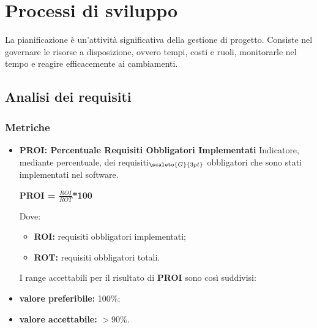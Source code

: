 \section{Processi di sviluppo}\label{QualitaDiProcessoProcessiDiSviluppo}
La pianificazione è un’attività significativa della gestione di progetto.
Consiste nel governare le risorse a disposizione, ovvero tempi, costi e ruoli, monitorarle nel tempo e reagire efficacemente ai cambiamenti.

\subsection{Analisi dei requisiti}\label{QualitaDiProcessoProcessiDiSviluppoAnalisiDeiRequisiti}
\subsubsection{Metriche}\label{MetricheProcessiDiSviluppo}
\begin{itemize}
	\item[] \textbf{PROI: Percentuale Requisiti Obbligatori Implementati}
	Indicatore, mediante percentuale, dei requisiti$_{\scaleto{G}{3pt}}$ obbligatori che sono stati implementati nel software.
	\begin{center}
		\textbf{PROI = $\frac{ROI}{ROT}$*100}
	\end{center}
	Dove:
	\begin{itemize}
		\item \textbf{ROI:} requisiti obbligatori implementati;
		\item \textbf{ROT:} requisiti obbligatori totali.
	\end{itemize}
	I range accettabili per il risultato di \textbf{PROI} sono così suddivisi:
	\item \textbf{valore preferibile:} 100\%;
	\item \textbf{valore accettabile:} $>$90\%.
\end{itemize}
